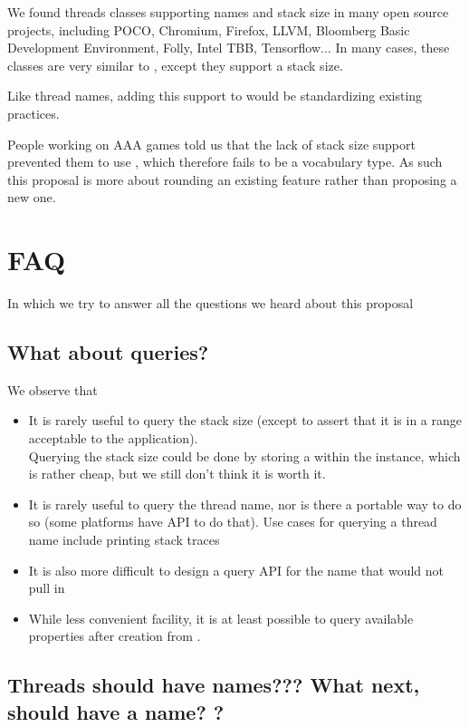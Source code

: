 \documentclass{wg21}
\begin{document}
We found threads classes supporting names and stack size in many open source projects, including POCO, Chromium, Firefox, LLVM, Bloomberg Basic Development Environment, Folly, Intel TBB, Tensorflow...
In many cases, these classes are very similar to , except they support a stack size.

Like thread names, adding this support to  would be standardizing existing practices.

People working on AAA games told us that the lack of stack size support prevented them to use , which therefore fails to be a vocabulary type.
As such this proposal is more about rounding an existing feature rather than proposing a new one.

\section{FAQ}

In which we try to answer all the questions we heard about this proposal

\subsection{What about queries?}

We observe that
\begin{itemize}
\item It is rarely useful to query the stack size (except to assert that it is in a range acceptable to the application).\\
Querying the stack size could be done by storing a  within the  instance, which is rather cheap,
but we still don't think it is worth it.
\item It is rarely useful to query the thread name, nor is there a portable way to do so (some platforms have API to do that). Use cases for querying a thread name include printing stack traces \cite{P0881R5}\\
\item It is also more difficult to design a query API for the name that would not pull in 
\item While less convenient facility, it is at least possible to query available properties after creation from .
\end{itemize}


\subsection{Threads should have names??? What next,  should have a name? ?}
\end{document}
